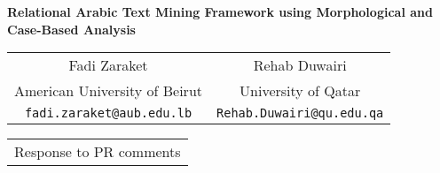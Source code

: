 \documentclass[12pt]{article}
\begin{document}
\pagestyle{fancy}
\chead{}

\cfoot{}
\renewcommand{\footrulewidth}{0.2pt}
\renewcommand{\headrulewidth}{0.2pt}


\begin{center}
{\Large \bf Relational Arabic Text Mining Framework using 
    Morphological
    and Case-Based Analysis }

\vspace{.1in}

\renewcommand{\arraystretch}{.6}
\begin{tabular}{cc}
Fadi Zaraket & Rehab Duwairi \\
American University of Beirut & University of Qatar \\
{\tt fadi.zaraket@aub.edu.lb} & {\tt Rehab.Duwairi@qu.edu.qa}
\end{tabular}

\vspace{.1in}

\renewcommand{\arraystretch}{.6}
\begin{tabular}{c}
{\small Response to PR comments } \\
\end{tabular}
\vspace{.1in}

\date{\today}
\end{center}
\end{document}
